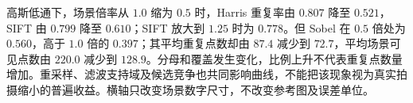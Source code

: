 高斯低通下，场景倍率从 $1.0$ 缩为 $0.5$ 时，Harris 重复率由 $0.807$ 降至 $0.521$，SIFT 由 $0.799$ 降至 $0.610$；SIFT 放大到 $1.25$ 时为 $0.778$。但 Sobel 在 $0.5$ 倍处为 $0.560$，高于 $1.0$ 倍的 $0.397$；其平均重复点数却由 $87.4$ 减少到 $72.7$，平均场景可见点数由 $220.0$ 减少到 $128.9$。分母和覆盖发生变化，比例上升不代表重复点数量增加。重采样、滤波支持域及候选竞争也共同影响曲线，不能把该现象视为真实拍摄缩小的普遍收益。横轴只改变场景数字尺寸，不改变参考图及误差单位。
